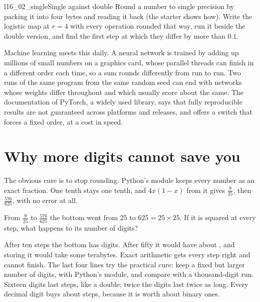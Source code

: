 \begin{lab}{l16_02_single}{Single against double}
Round a number to single precision by packing it into four bytes and reading
it back (the starter shows how). Write the logistic map at $r = 4$ with every
operation rounded that way, run it beside the double version, and find the
first step at which they differ by more than $\num{0.1}$.
\end{lab}

\begin{worldbox}
Machine learning meets this daily. A neural network is trained by adding up
millions of small numbers on a graphics card, whose parallel threads can
finish in a different order each time, so a sum rounds differently from run
to run. Two runs of the same program from the same random seed can end with
networks whose weights differ throughout \dash{} and which usually score
about the same. The documentation of PyTorch, a widely used library, says
that fully reproducible results are not guaranteed across platforms and
releases, and offers a switch that forces a fixed order, at a cost in speed.
\end{worldbox}

\section{Why more digits cannot save you}
\label{sec:ch16-exact}

\noindent
The obvious cure is to stop rounding. Python's  module keeps
every number as an exact fraction. One tenth stays one tenth, and
$4x(1 - x)$ from it gives $\tfrac{9}{25}$, then $\tfrac{576}{625}$, with no
error at all.

\begin{think}
From $\tfrac{9}{25}$ to $\tfrac{576}{625}$ the bottom went from $25$ to
$625 = 25 \times 25$. If it is squared at every step, what happens to its
number of digits?
\end{think}



\noindent
After ten steps the bottom has  digits. After fifty it
would have about , and storing it would take some
 terabytes. Exact arithmetic gets every step right
and cannot finish. The last four lines try the practical cure: keep a fixed
but larger number of digits, with Python's  module, and compare
with a thousand-digit run. Sixteen digits last 
steps, like a double; twice the digits last twice as long. Every decimal
digit buys about  steps, because it is worth about
 binary ones.

